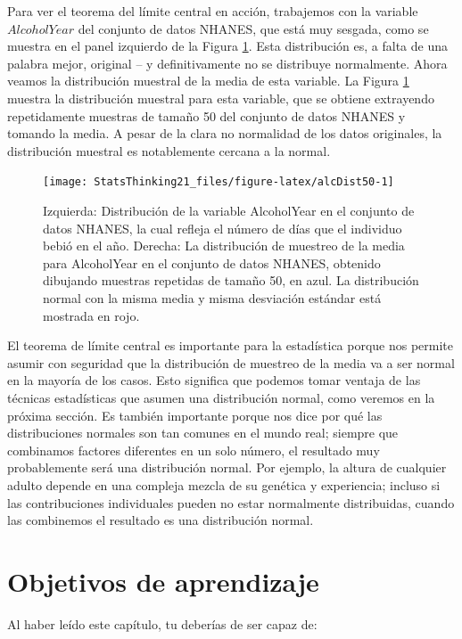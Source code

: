 \documentclass[
  12pt,
]{book}
\begin{document}
Para ver el teorema del límite central en acción, trabajemos con la variable \(AlcoholYear\) del conjunto de datos NHANES, que está muy sesgada, como se muestra en el panel izquierdo de la Figura \ref{fig:alcDist50}. Esta distribución es, a falta de una palabra mejor, original -- y definitivamente no se distribuye normalmente. Ahora veamos la distribución muestral de la media de esta variable. La Figura \ref{fig:alcDist50} muestra la distribución muestral para esta variable, que se obtiene extrayendo repetidamente muestras de tamaño 50 del conjunto de datos NHANES y tomando la media. A pesar de la clara no normalidad de los datos originales, la distribución muestral es notablemente cercana a la normal.

\begin{figure}
\texttt{[image: StatsThinking21\_files/figure-latex/alcDist50-1]} \caption{Izquierda: Distribución de la variable AlcoholYear en el conjunto de datos NHANES, la cual refleja el número de días que el individuo bebió en el año. Derecha: La distribución de muestreo de la media para AlcoholYear en el conjunto de datos NHANES, obtenido dibujando muestras repetidas de tamaño 50, en azul. La distribución normal con la misma media y  misma desviación estándar está mostrada en rojo.}\label{fig:alcDist50}
\end{figure}

El teorema de límite central es importante para la estadística porque nos permite asumir con seguridad que la distribución de muestreo de la media va a ser normal en la mayoría de los casos. Esto significa que podemos tomar ventaja de las técnicas estadísticas que asumen una distribución normal, como veremos en la próxima sección. Es también importante porque nos dice por qué las distribuciones normales son tan comunes en el mundo real; siempre que combinamos factores diferentes en un solo número, el resultado muy probablemente será una distribución normal. Por ejemplo, la altura de cualquier adulto depende en una compleja mezcla de su genética y experiencia; incluso si las contribuciones individuales pueden no estar normalmente distribuidas, cuando las combinemos el resultado es una distribución normal.

\hypertarget{objetivos-de-aprendizaje-6}{%
\section{Objetivos de aprendizaje}\label{objetivos-de-aprendizaje-6}}

Al haber leído este capítulo, tu deberías de ser capaz de:
\end{document}
